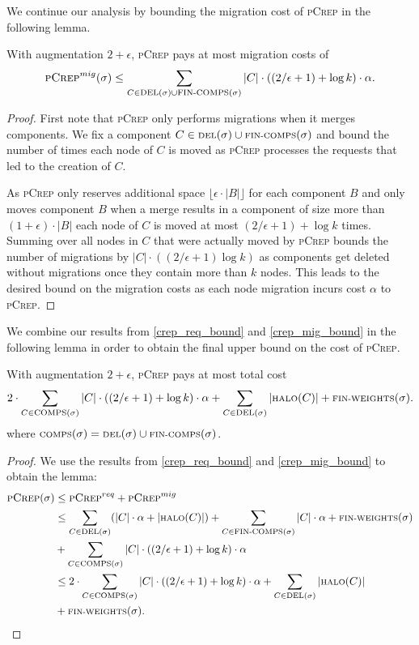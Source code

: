 \documentclass[a4paper,UKenglish,cleveref, autoref, thm-restate,authorcolumns]{lipics-v2019}
\newcommand{\nl}{\newline}
\newcommand{\adjDel}{\textsc{pCrep}}
\newcommand{\del}{\text{\scriptsize DEL}}
\newcommand{\halo}{\text{\scriptsize HALO}}
\newcommand{\finalComps}{\text{\scriptsize FIN-COMPS}}
\newcommand{\finalWeights}{\text{\scriptsize FIN-WEIGHTS}}
\newcommand{\comps}{\text{\scriptsize COMPS}}
\begin{document}
We continue our analysis by bounding the migration cost of \adjDel{} in the following lemma.

\begin{lemma}
	\label{crep_mig_bound}
	With augmentation $2+\epsilon$, \adjDel{} pays at most migration costs of
	\begin{align*}
	\adjDel^{mig}(\sigma)\leq\sum_{C\in\del{}(\sigma)\cup\finalComps(\sigma)}|C|\cdot((2/\epsilon+1)+\log k)\cdot\alpha.
	\end{align*}
\end{lemma}

\begin{proof}
	First note that \adjDel{} only performs migrations when it merges components.
	We fix a component $C\in\del{}(\sigma)\cup \finalComps(\sigma)$ and bound the number of times each node of $C$ is moved as \adjDel{} processes the requests that led to the creation of $C$. 
	
	As \adjDel{} only reserves additional space $\lfloor\epsilon\cdot|B|\rfloor$ for each component $B$ and only moves component $B$ when a merge results in a component of size more than $(1+\epsilon)\cdot|B|$ each node of $C$ is moved at most
	$(2/\epsilon+1)+\log k$ times. Summing over all nodes in $C$ that were actually moved by \adjDel{} bounds the number of migrations by $|C|\cdot((2/\epsilon+1) \log k)$ as components get deleted without migrations once they contain more than $k$ nodes. This leads to the desired bound on the migration costs as each node migration incurs cost $\alpha$ to \adjDel{}.
\end{proof}


We combine our results from \cref{crep_req_bound} and \cref{crep_mig_bound} in the following lemma in order to obtain the final upper bound on the cost of \adjDel{}.

\begin{lemma}
	\label{crep_upper_bound}
	With augmentation $2+\epsilon$, \adjDel{} pays at most total cost\nl
	\begin{align*}
	2\cdot\sum_{C\in\comps(\sigma)}|C|\cdot((2/\epsilon+1)+\log k)\cdot\alpha+\sum_{C\in\del{}(\sigma)}|\halo(C)|+\finalWeights(\sigma).
	\end{align*}
	where $\comps(\sigma)=\del{}(\sigma)\cup\finalComps(\sigma)$.
\end{lemma}

\begin{proof}
	We use the results from \cref{crep_req_bound} and \cref{crep_mig_bound} to obtain the lemma:
	\begin{align*}
	\adjDel(\sigma) & \leq \adjDel^{req} + \adjDel^{mig}\\
	& \leq \sum_{C\in\del{}(\sigma)}(|C|\cdot\alpha+|\halo(C)|)+\sum_{C\in \finalComps(\sigma)}|C|\cdot\alpha+\finalWeights(\sigma)\\ &+\sum_{C\in\comps(\sigma)}|C|\cdot((2/\epsilon+1)+\log k)\cdot\alpha\\
	&\leq 2\cdot\sum_{C\in\comps(\sigma)}|C|\cdot((2/\epsilon+1)+\log k)\cdot\alpha+\sum_{C\in\del{}(\sigma)}|\halo(C)|\\
	&+\finalWeights(\sigma).
	\end{align*}
\end{proof}
\end{document}

